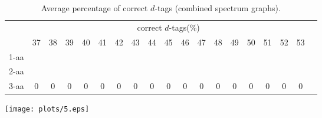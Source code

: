 \documentclass{article}
\begin{document}
\begin{table}[h]\tiny
\vspace{3mm}
{\centering
\begin{center}
\begin{tabular}{|l|c|c|c|c|c|c|c|c|c|c|c|c|c|c|c|c|c|c|}
  \hline
  & \multicolumn{ 17 }{|c|}{correct $d$-tags(\%)} \\
  \cline{2- 18}
    & 37 & 38 & 39 & 40 & 41 & 42 & 43 & 44 & 45 & 46 & 47 & 48 & 49 & 50 & 51 & 52 & 53\\
  \hline
1-aa  &  &  &  &  &  &  &  &  &  &  &  &  &  &  &  &  & \\
2-aa  &  &  &  &  &  &  &  &  &  &  &  &  &  &  &  &  & \\
3-aa  & 0 & 0 & 0 & 0 & 0 & 0 & 0 & 0 & 0 & 0 & 0 & 0 & 0 & 0 & 0 & 0 & 0\\
 \hline
\end{tabular}
\end{center}
\par}
\centering

\caption{ Average percentage of correct $d$-tags (combined spectrum graphs).}

\vspace{3mm}
\label{table:correct-d-tags}
\end{table}
\texttt{[image: plots/5.eps]}
\end{document}
